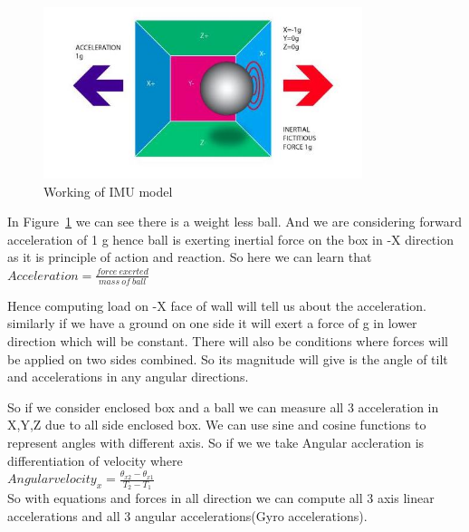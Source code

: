 \begin{figure}[!htb]
\includegraphics[width=\textwidth,height=5cm,keepaspectratio]{./figures/WorkingIMU.jpg}
\caption{Working of IMU model~\cite{StarElec}}
\label{fig:WorkingIMU}
\end{figure}

In Figure~\ref{fig:WorkingIMU}  we can see there is a weight less ball. And we are considering forward acceleration of 1 g hence ball is exerting inertial force on the box in -X direction as it is principle of action and reaction.
So here we can learn that \\

$Acceleration = \frac{force\ exerted}{mass\ of\ ball} $

Hence computing load on -X face of wall will tell us about the acceleration.
similarly if we have a ground on one side it will exert a force of g in lower direction which will be constant.
There will also be conditions where forces will be applied on two sides combined.
So its magnitude will give is the angle of tilt and accelerations in any angular directions.

So if we consider enclosed box and a ball we can measure all 3 acceleration in X,Y,Z due to all side enclosed box.
We can use sine and cosine functions to represent angles with different axis. 
So if we we take 
Angular accleration is differentiation of velocity
where\\

$Angular velocity_x= \frac{\theta_{x2} -\theta_{x1}}{T_2-T_1}$\\

So with equations and forces in all direction we can compute all 3 axis linear accelerations and all 3 angular accelerations(Gyro accelerations).